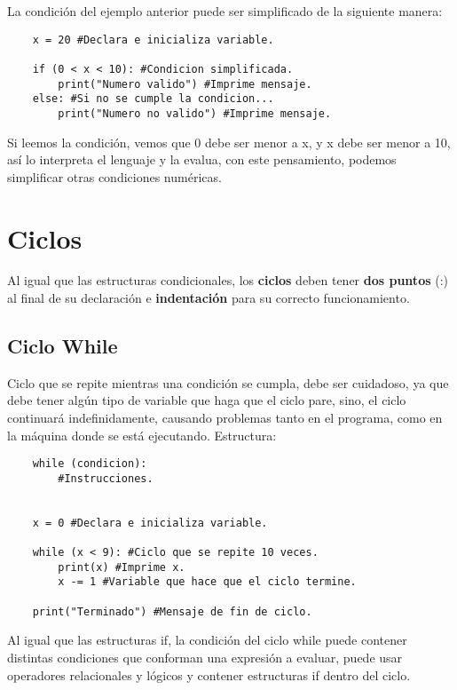 La condición del ejemplo anterior puede ser simplificado de la siguiente manera:
\begin{lstlisting}
	x = 20 #Declara e inicializa variable.
	
	if (0 < x < 10): #Condicion simplificada.
		print("Numero valido") #Imprime mensaje.
	else: #Si no se cumple la condicion...
		print("Numero no valido") #Imprime mensaje.
\end{lstlisting}

Si leemos la condición, vemos que 0 debe ser menor a x, y x debe ser menor a 10, así lo interpreta el lenguaje y la evalua, con este pensamiento, podemos simplificar otras condiciones numéricas.



\section{Ciclos}
\hspace{0.55cm}Al igual que las estructuras condicionales, los \textbf{ciclos} deben tener \textbf{dos puntos} (:) al final de su declaración e \textbf{indentación} para su correcto funcionamiento.


\subsection{Ciclo While}
\hspace{0.55cm}Ciclo que se repite mientras una condición se cumpla, debe ser cuidadoso, ya que debe tener algún tipo de variable que haga que el ciclo pare, sino, el ciclo continuará indefinidamente, causando problemas tanto en el programa, como en la máquina donde se está ejecutando. Estructura:
\begin{lstlisting}
	while (condicion):
		#Instrucciones.
	
	
	x = 0 #Declara e inicializa variable.
	
	while (x < 9): #Ciclo que se repite 10 veces.
		print(x) #Imprime x.
		x -= 1 #Variable que hace que el ciclo termine.
		
	print("Terminado") #Mensaje de fin de ciclo.
\end{lstlisting}

Al igual que las estructuras if, la condición del ciclo while puede contener distintas condiciones que conforman una expresión a evaluar, puede usar operadores relacionales y lógicos y contener estructuras if dentro del ciclo.



